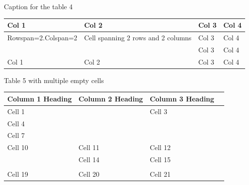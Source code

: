 \documentclass[11pt,a4paper]{article}
\begin{document}
Caption for the table 4

\begin{table}[h]
\begin{tabular}{|l|l|l|l|}
\hline
Col 1 & Col 2 & Col 3 & Col 4 \\ \hline
Rowspan=2.Colspan=2 & Cell spanning 2 rows and 2 columns & Col 3 & Col 4 \\ \hline
 &  & Col 3 & Col 4 \\ \hline
Col 1 & Col 2 & Col 3 & Col 4 \\ \hline
\end{tabular}
\end{table}

Table 5 with multiple empty cells

\begin{table}[h]
\begin{tabular}{|l|l|l|l|}
\hline
Column 1 Heading & Column 2 Heading & Column 3 Heading &  \\ \hline
Cell 1 &  & Cell 3 &  \\ \hline
Cell 4 &  &  &  \\ \hline
Cell 7 &  &  &  \\ \hline
Cell 10 & Cell 11 & Cell 12 &  \\ \hline
 & Cell 14 & Cell 15 &  \\ \hline
 &  &  &  \\ \hline
Cell 19 & Cell 20 & Cell 21 &  \\ \hline
\end{tabular}
\end{table}
\end{document}
